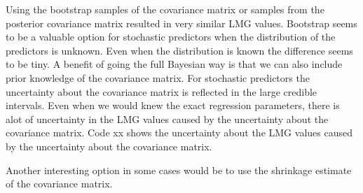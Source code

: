 \documentclass[11pt,a4paper,twoside]{book}\usepackage[]{graphicx}\usepackage[]{color}
\begin{document}
Using the bootstrap samples of the covariance matrix or samples from the posterior covariance matrix resulted in very similar LMG values. Bootstrap seems to be a valuable option for stochastic predictors when the distribution of the predictors is unknown. Even when the distribution is known the difference seems to be tiny. A benefit of going the full Bayesian way is that we can also include prior knowledge of the covariance matrix. For stochastic predictors the uncertainty about the covariance matrix is reflected in the large credible intervals. Even when we would knew the exact regression parameters, there is alot of uncertainty in the LMG values caused by the uncertainty about the covariance matrix. Code xx shows the uncertainty about the LMG values caused by the uncertainty about the covariance matrix. 

Another interesting option in some cases would be to use the shrinkage estimate of the covariance matrix. 
\end{document}
